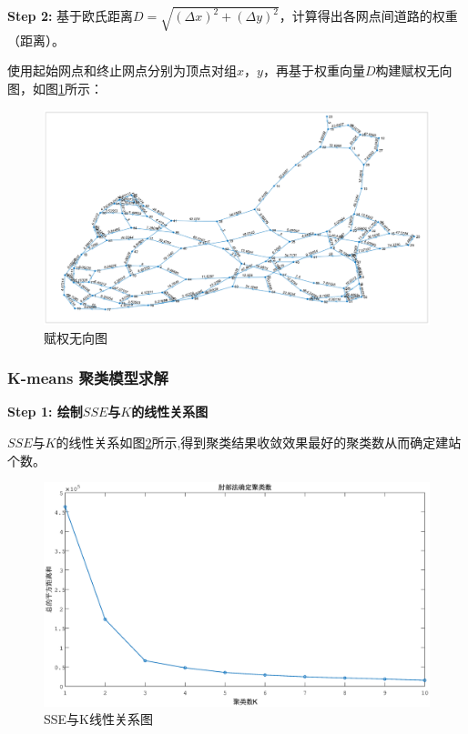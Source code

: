 \documentclass[withoutpreface,bwprint]{cumcmthesis} %
\begin{document}
\textbf{Step 2: }基于欧氏距离$D=\sqrt{{{(\Delta  x)}^{2}}+{{(\Delta  y)}^{2}}}$，计算得出各网点间道路的权重（距离）。

使用起始网点和终止网点分别为顶点对组$x$，$y$，再基于权重向量$D$构建赋权无向图，如图\ref{fig:赋权无向图}所示：
	\begin{figure}[htbp]
		\centering
		\includegraphics[width=16cm]{raw_G.eps}
		\caption{赋权无向图}
		\label{fig:赋权无向图}
	\end{figure}
	
\subsubsection{K-means 聚类模型求解}
	\textbf{Step 1: 绘制$SSE$与$K$的线性关系图}
	
$SSE$与$K$的线性关系如图\ref{fig:SSE与K线性关系图}所示,得到聚类结果收敛效果最好的聚类数从而确定建站个数。
	\begin{figure}[h]
		\centering
		\includegraphics[width=13cm]{elbow.eps}
		\caption{SSE与K线性关系图}
		\label{fig:SSE与K线性关系图}
	\end{figure}
	
\end{document}
